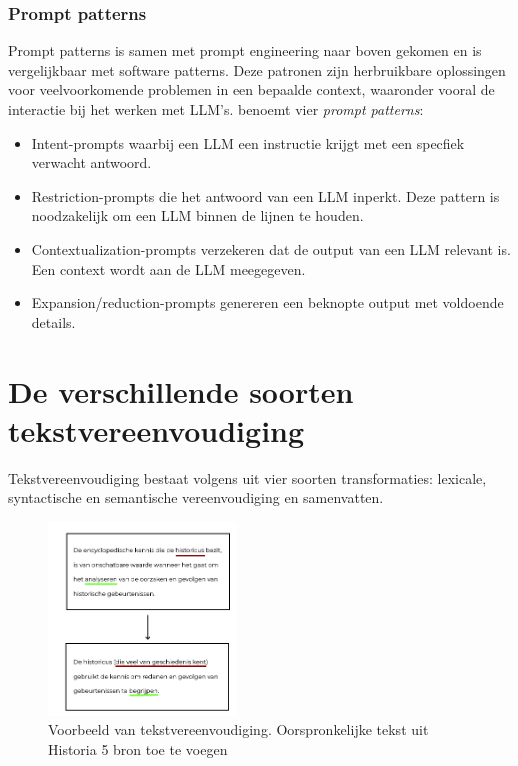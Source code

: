 \subsubsection{Prompt patterns}

Prompt patterns is samen met prompt engineering naar boven gekomen en is vergelijkbaar met software patterns. Deze patronen zijn herbruikbare oplossingen voor veelvoorkomende problemen in een bepaalde context, waaronder vooral de interactie bij het werken met LLM's. \textcite{White2023} benoemt vier \textit{prompt patterns}:

\begin{itemize}
\item	Intent-prompts waarbij een LLM een instructie krijgt met een specfiek verwacht antwoord.
\item	Restriction-prompts die het antwoord van een LLM inperkt. Deze pattern is noodzakelijk om een LLM binnen de lijnen te houden.
\item 	Contextualization-prompts verzekeren dat de output van een LLM relevant is. Een context wordt aan de LLM meegegeven.
\item	Expansion/reduction-prompts genereren een beknopte output met voldoende details. 
\end{itemize}

\section{De verschillende soorten tekstvereenvoudiging}

Tekstvereenvoudiging bestaat volgens \textcite{Siddharthan2014} uit vier soorten transformaties: lexicale, syntactische en semantische vereenvoudiging en samenvatten.

\begin{figure}[H]
	\begin{center}
			\includegraphics[width=5cm]{img/voorbeeld-manuele-vereenvoudiging.png}
	\end{center}
	\caption{Voorbeeld van tekstvereenvoudiging. Oorspronkelijke tekst uit Historia 5 bron toe te voegen}
\end{figure}


